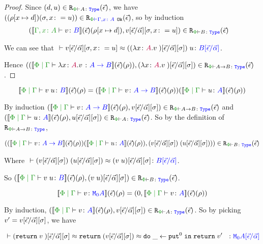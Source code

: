 \documentclass{Report}
\newcommand\erelates[2]{\texttt{R}_{\wellformedt{#1}{#2}}}
\newcommand\erelatesg[2]{\texttt{R}_{\wellformedok{#1}{#2}}}
\newcommand{\av}[0]{\vec{\a}}
\newcommand\inLogRel[5]{(#1, #2)\in\erelates{#3}{#4}(#5)}
\newcommand\inLogRelE[4]{\inLogRel{#1}{#2}{#3}{#4}{\ev}}
\newcommand{\inLogRelPE}[3]{\inLogRelE{#1}{#2}{\P}{#3}}
\newcommand{\inLogRelPEG}[3]{({#1}{#2})\in\erelatesg{\P}{#3}(\ev)}
\newcommand\fundSub[0]{\ssub{\av}{\ev}\ssi}
\newcommand\fundRho[0]{(\ev)(\rho)}
\begin{document}
\begin{proof}
    Since $\inLogRelPE{d}{u}{A}$, we have $\inLogRelPEG{(\rho[x\mapsto d])}{(\si, x\setto u)}{\gax}$, so by induction
    \begin{align*}
        \inLogRelPE{\deno{\typerelation{\gax}{v}{B}}(\ev)(\rho[x\mapsto d])&}{v\ssub{\av}{\ev}\sub{\si, x\setto u}}{B}
    \end{align*}

    We can see that $\zberelation{v\ssub{\av}{\ev}{\sub{\si, x\setto u}}}{\apply{((\lam{x}{A}{v})\fundSub)}{u}}{B\ssub{\av}{\ev}}$.

    Hence $\inLogRelPE{(\deno{\gpetyperelation{\lam{x}{A}{v}}{\ab}}\fundRho) }{(\lam{x}{A}{v})\fundSub}{\ab}$.
\end{proof}

\case{\vapply}
\begin{equation}
    \deno{\gpetyperelation{\apply{v}{u}}{B}}\fundRho = (\deno{\gpetyperelation{v}{\ab}}\fundRho)(\deno{\gpetyperelation{u}{A}}\fundRho)
\end{equation}

By induction $\inLogRelPE{\deno{\gpetyperelation{v}{\ab}}\fundRho}{v\fundSub}{\ab}$ and $\inLogRelPE{\deno{\gpetyperelation{u}{A}}\fundRho}{u\fundSub}{A}$. So by the definition of $\erelates{\P}{\ab}$, 

\begin{align*}
   \inLogRelPE{(\deno{\gpetyperelation{v}{\ab}}\fundRho)(\deno{\gpetyperelation{u}{A}}\fundRho)}{\apply{(v\fundSub)}{(u\fundSub)})}{B}
\end{align*}

Where $\zberelation{\apply{(v\fundSub)}{(u\fundSub)}}{(\apply{v}{u})\fundSub}{B\ssub{\av}{\ev}}$.

So $\inLogRelPE{\deno{\gpetyperelation{\apply{v}{u}}{B}}\fundRho}{(\apply{v}{u})\fundSub}{B}$.


\case{\vreturn}

\begin{equation}
    \deno{\gpetyperelation{v}{\M{0}{A}}}\fundRho = (0, \deno{\gpetyperelation{v}{A}}\fundRho)
\end{equation}

By induction, $\inLogRelPE{\deno{\gpetyperelation{v}{A}}\fundRho}{v\fundSub}{A}$. So by picking $v' = v\fundSub$, we have

\begin{equation}
    \zberelation{(\return{v})\fundSub}{\return{(v\fundSub)\beequiv \doin{\_}{\put^0}{\return{v'}}}}{\M{0}{A\ssub{\av}{\ev}}}
\end{equation}
\end{document}

